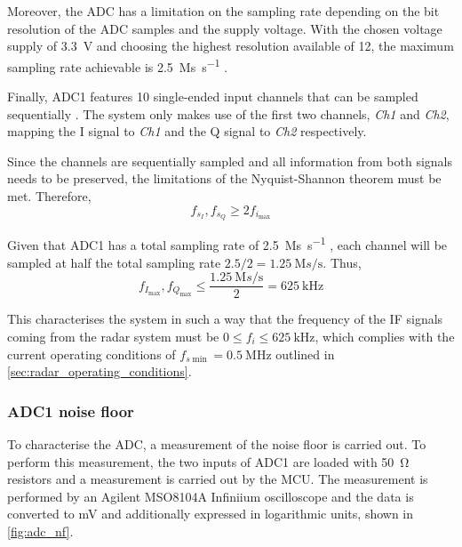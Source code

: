 Moreover, the ADC has a limitation on the sampling rate depending on the bit resolution of the ADC samples and the supply voltage. With the chosen voltage supply of \SI{3.3}{\volt} and choosing the highest resolution available of \SI{12}{\bit}, the maximum sampling rate achievable is \SI{2.5}{\mega s\per\second} \cite[p.~103]{STMicroelectronics2022}.

Finally, ADC1 features 10 single-ended input channels that can be sampled sequentially \cite[p.~355]{STMicroelectronics2022a}. The system only makes use of the first two channels, \textit{Ch1} and \textit{Ch2}, mapping the I signal to \textit{Ch1} and the Q signal to \textit{Ch2} respectively.

Since the channels are sequentially sampled and all information from both signals needs to be preserved, the limitations of the Nyquist-Shannon theorem \cite{Shannon1949} must be met. Therefore,
\begin{equation} \label{eqn:nyquist_sampling}
	f_{s_{I}}, f_{s_{Q}} \ge 2 f_{i_{\max}}
\end{equation}

Given that ADC1 has a total sampling rate of \SI{2.5}{\mega s\per\second} \cite[p.~103]{STMicroelectronics2022}, each channel will be sampled at half the total sampling rate $2.5/2 = \SI{1.25}{\mega s\per\second}$. Thus,
\begin{equation} \label{eqn:nyquist_sampling}
	f_{I_{\max}}, f_{Q_{\max}} \le \frac{\SI{1.25}{\mega s\per\second}}{2} = \SI{625}{\kilo\hertz}
\end{equation}

This characterises the system in such a way that the frequency of the IF signals coming from the radar system must be $ 0 \le f_i \le \SI{625}{\kilo\hertz}$, which complies with the current operating conditions of $f_{s\min} = \SI{0.5}{\mega\hertz}$ outlined in \cref{sec:radar_operating_conditions}.

\subsubsection{ADC1 noise floor}
To characterise the ADC, a measurement of the noise floor is carried out. To perform this measurement, the two inputs of ADC1 are loaded with \SI{50}{\ohm} resistors and a measurement is carried out by the MCU. The measurement is performed by an Agilent MSO8104A Infiniium oscilloscope and the data is converted to mV and additionally expressed in logarithmic units, shown in \cref{fig:adc_nf}.

